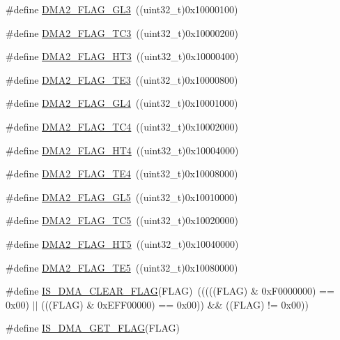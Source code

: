 \begin{DoxyCompactItemize}
\item 
\#define \mbox{\hyperlink{group___d_m_a__flags__definition_ga4c56bb0c92db51e9147b122f2dff1c0a}{D\+M\+A2\+\_\+\+F\+L\+A\+G\+\_\+\+G\+L3}}~((uint32\+\_\+t)0x10000100)
\item 
\#define \mbox{\hyperlink{group___d_m_a__flags__definition_ga3b704db8a45d4410509f3552e8b2095f}{D\+M\+A2\+\_\+\+F\+L\+A\+G\+\_\+\+T\+C3}}~((uint32\+\_\+t)0x10000200)
\item 
\#define \mbox{\hyperlink{group___d_m_a__flags__definition_ga1af48c549d9aa04e8161cb8b398ef39c}{D\+M\+A2\+\_\+\+F\+L\+A\+G\+\_\+\+H\+T3}}~((uint32\+\_\+t)0x10000400)
\item 
\#define \mbox{\hyperlink{group___d_m_a__flags__definition_gacdf472c665395a07681a7d499ac0f0bb}{D\+M\+A2\+\_\+\+F\+L\+A\+G\+\_\+\+T\+E3}}~((uint32\+\_\+t)0x10000800)
\item 
\#define \mbox{\hyperlink{group___d_m_a__flags__definition_ga624ff69707b76813a2170e4b1e0bda71}{D\+M\+A2\+\_\+\+F\+L\+A\+G\+\_\+\+G\+L4}}~((uint32\+\_\+t)0x10001000)
\item 
\#define \mbox{\hyperlink{group___d_m_a__flags__definition_gad4f76b7a22233dbb9daaad448c431165}{D\+M\+A2\+\_\+\+F\+L\+A\+G\+\_\+\+T\+C4}}~((uint32\+\_\+t)0x10002000)
\item 
\#define \mbox{\hyperlink{group___d_m_a__flags__definition_ga3dde40e2dbcdb12e4c1a2a2b5a8b3a60}{D\+M\+A2\+\_\+\+F\+L\+A\+G\+\_\+\+H\+T4}}~((uint32\+\_\+t)0x10004000)
\item 
\#define \mbox{\hyperlink{group___d_m_a__flags__definition_gac1178b804cad45fe82236dbd2c25cc64}{D\+M\+A2\+\_\+\+F\+L\+A\+G\+\_\+\+T\+E4}}~((uint32\+\_\+t)0x10008000)
\item 
\#define \mbox{\hyperlink{group___d_m_a__flags__definition_gab0468b7a6e2fbdd5428da87252865623}{D\+M\+A2\+\_\+\+F\+L\+A\+G\+\_\+\+G\+L5}}~((uint32\+\_\+t)0x10010000)
\item 
\#define \mbox{\hyperlink{group___d_m_a__flags__definition_ga5ba4dce652a1a29bedbd7d8dc35ca4ec}{D\+M\+A2\+\_\+\+F\+L\+A\+G\+\_\+\+T\+C5}}~((uint32\+\_\+t)0x10020000)
\item 
\#define \mbox{\hyperlink{group___d_m_a__flags__definition_ga23aabf34428e04d7b46368e0b595a4d5}{D\+M\+A2\+\_\+\+F\+L\+A\+G\+\_\+\+H\+T5}}~((uint32\+\_\+t)0x10040000)
\item 
\#define \mbox{\hyperlink{group___d_m_a__flags__definition_gae57659b4349d03eb70db63bb2aa40505}{D\+M\+A2\+\_\+\+F\+L\+A\+G\+\_\+\+T\+E5}}~((uint32\+\_\+t)0x10080000)
\item 
\#define \mbox{\hyperlink{group___d_m_a__flags__definition_ga4b33e418489c9a3c9adcbdbaca93e4a3}{I\+S\+\_\+\+D\+M\+A\+\_\+\+C\+L\+E\+A\+R\+\_\+\+F\+L\+AG}}(F\+L\+AG)~(((((F\+L\+AG) \& 0x\+F0000000) == 0x00) $\vert$$\vert$ (((\+F\+L\+A\+G) \& 0x\+E\+F\+F00000) == 0x00)) \&\& ((\+F\+L\+A\+G) != 0x00))
\item 
\#define \mbox{\hyperlink{group___d_m_a__flags__definition_ga98e421aa0a15fbeecb4cab3612985676}{I\+S\+\_\+\+D\+M\+A\+\_\+\+G\+E\+T\+\_\+\+F\+L\+AG}}(F\+L\+AG)
\end{DoxyCompactItemize}


